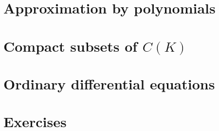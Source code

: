 \documentclass[12 pt]{article}
\numberwithin{equation}{section}
\begin{document}
\section{Approximation by polynomials}











\section{Compact subsets of $C(K)$}







\section{Ordinary differential equations}






\section{Exercises}
\end{document}
